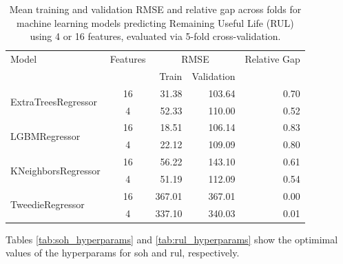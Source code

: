 \begin{table}[H]
    \centering
    \caption{Mean training and validation RMSE and relative gap across folds for machine learning models predicting Remaining Useful Life (RUL) using 4 or 16 features, evaluated via 5-fold cross-validation.}
    \label{tab:rul_optim}
    \begin{tabular}{lcrrr}
    \toprule
    Model & Features & \multicolumn{2}{c}{RMSE} & Relative Gap \\
    \cmidrule(lr){3-4}
          &          & Train & Validation & \\
    \midrule
    \multirow{2}{*}{ExtraTreesRegressor} & 16 & 31.38 & 103.64 & 0.70 \\
                                         & 4  & 52.33 & 110.00 & 0.52 \\
    \cmidrule{1-5}
    \multirow{2}{*}{LGBMRegressor}       & 16 & 18.51 & 106.14 & 0.83 \\
                                         & 4  & 22.12 & 109.09 & 0.80 \\
    \cmidrule{1-5}
    \multirow{2}{*}{KNeighborsRegressor} & 16 & 56.22 & 143.10 & 0.61 \\
                                         & 4  & 51.19 & 112.09 & 0.54 \\
    \cmidrule{1-5}
    \multirow{2}{*}{TweedieRegressor}    & 16 & 367.01 & 367.01 & 0.00 \\
                                         & 4  & 337.10 & 340.03 & 0.01 \\
    \bottomrule
    \end{tabular}
\end{table}


Tables \ref{tab:soh_hyperparams} and \ref{tab:rul_hyperparams} show the optimimal values of the hyperparams for \ac{soh} and \ac{rul}, respectively. 

